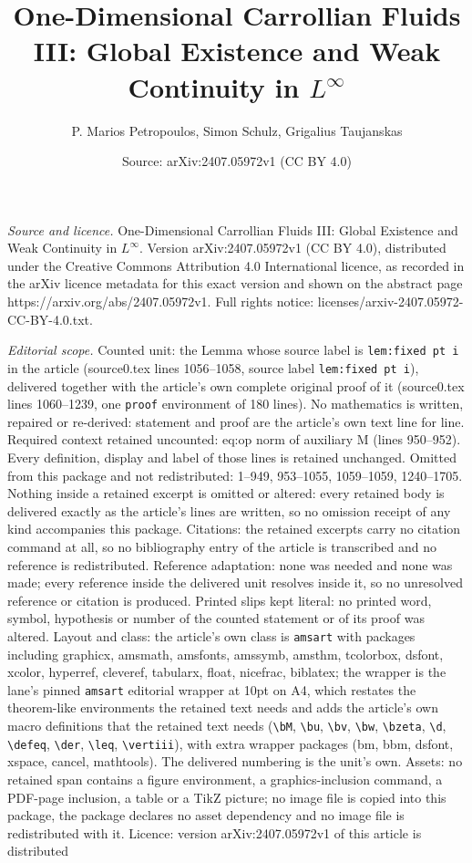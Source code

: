 \documentclass[10pt,a4paper]{amsart}
\title[One-Dimensional Carrollian Fluids III: Global Existence and ]{One-Dimensional Carrollian Fluids III: Global Existence and Weak Continuity in $L^\infty$}
\author{P. Marios Petropoulos, Simon Schulz, Grigalius Taujanskas}
\date{Source: arXiv:2407.05972v1 (CC BY 4.0)}
\begin{document}
\maketitle

\noindent\emph{Source and licence.} One-Dimensional Carrollian Fluids III: Global Existence and Weak Continuity in $L^\infty$. Version arXiv:2407.05972v1 (CC BY 4.0), distributed under the Creative Commons Attribution 4.0 International licence, as recorded in the arXiv licence metadata for this exact version and shown on the abstract page https://arxiv.org/abs/2407.05972v1. Full rights notice: licenses/arxiv-2407.05972-CC-BY-4.0.txt.\par\smallskip

\noindent\textit{Editorial scope.} Counted unit: the Lemma whose source label is \texttt{lem:fixed pt i} in the article (source0.tex lines 1056--1058, source label \texttt{lem:fixed pt i}), delivered together with the article's own complete original proof of it (source0.tex lines 1060--1239, one \texttt{proof} environment of 180 lines). No mathematics is written, repaired or re-derived: statement and proof are the article's own text line for line. Required context retained uncounted: eq:op norm of auxiliary M (lines 950--952). Every definition, display and label of those lines is retained unchanged. Omitted from this package and not redistributed: 1--949, 953--1055, 1059--1059, 1240--1705. Nothing inside a retained excerpt is omitted or altered: every retained body is delivered exactly as the article's lines are written, so no omission receipt of any kind accompanies this package. Citations: the retained excerpts carry no citation command at all, so no bibliography entry of the article is transcribed and no reference is redistributed. Reference adaptation: none was needed and none was made; every reference inside the delivered unit resolves inside it, so no unresolved reference or citation is produced. Printed slips kept literal: no printed word, symbol, hypothesis or number of the counted statement or of its proof was altered. Layout and class: the article's own class is \texttt{amsart} with packages including graphicx, amsmath, amsfonts, amssymb, amsthm, tcolorbox, dsfont, xcolor, hyperref, cleveref, tabularx, float, nicefrac, biblatex; the wrapper is the lane's pinned \texttt{amsart} editorial wrapper at 10pt on A4, which restates the theorem-like environments the retained text needs and adds the article's own macro definitions that the retained text needs (\texttt{\textbackslash bM}, \texttt{\textbackslash bu}, \texttt{\textbackslash bv}, \texttt{\textbackslash bw}, \texttt{\textbackslash bzeta}, \texttt{\textbackslash d}, \texttt{\textbackslash defeq}, \texttt{\textbackslash der}, \texttt{\textbackslash leq}, \texttt{\textbackslash vertiii}), with extra wrapper packages (bm, bbm, dsfont, xspace, cancel, mathtools). The delivered numbering is the unit's own. Assets: no retained span contains a figure environment, a graphics-inclusion command, a PDF-page inclusion, a table or a TikZ picture; no image file is copied into this package, the package declares no asset dependency and no image file is redistributed with it. Licence: version arXiv:2407.05972v1 of this article is distributed 
\end{document}

